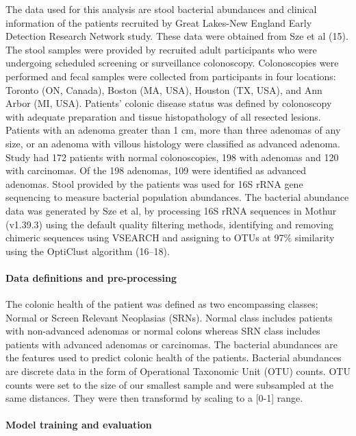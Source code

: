 \documentclass[11pt,]{article}
\let\oldparagraph\paragraph
\renewcommand{\paragraph}[1]{\oldparagraph{#1}\mbox{}}
\begin{document}
The data used for this analysis are stool bacterial abundances and
clinical information of the patients recruited by Great Lakes-New
England Early Detection Research Network study. These data were obtained
from Sze et al (15). The stool samples were provided by recruited adult
participants who were undergoing scheduled screening or surveillance
colonoscopy. Colonoscopies were performed and fecal samples were
collected from participants in four locations: Toronto (ON, Canada),
Boston (MA, USA), Houston (TX, USA), and Ann Arbor (MI, USA). Patients'
colonic disease status was defined by colonoscopy with adequate
preparation and tissue histopathology of all resected lesions. Patients
with an adenoma greater than 1 cm, more than three adenomas of any size,
or an adenoma with villous histology were classified as advanced
adenoma. Study had 172 patients with normal colonoscopies, 198 with
adenomas and 120 with carcinomas. Of the 198 adenomas, 109 were
identified as advanced adenomas. Stool provided by the patients was used
for 16S rRNA gene sequencing to measure bacterial population abundances.
The bacterial abundance data was generated by Sze et al, by processing
16S rRNA sequences in Mothur (v1.39.3) using the default quality
filtering methods, identifying and removing chimeric sequences using
VSEARCH and assigning to OTUs at 97\% similarity using the OptiClust
algorithm (16--18).

\paragraph{Data definitions and
pre-processing}\label{data-definitions-and-pre-processing}

The colonic health of the patient was defined as two encompassing
classes; Normal or Screen Relevant Neoplasias (SRNs). Normal class
includes patients with non-advanced adenomas or normal colons whereas
SRN class includes patients with advanced adenomas or carcinomas. The
bacterial abundances are the features used to predict colonic health of
the patients. Bacterial abundances are discrete data in the form of
Operational Taxonomic Unit (OTU) counts. OTU counts were set to the size
of our smallest sample and were subsampled at the same distances. They
were then transformd by scaling to a {[}0-1{]} range.

\paragraph{Model training and
evaluation}\label{model-training-and-evaluation}
\end{document}
